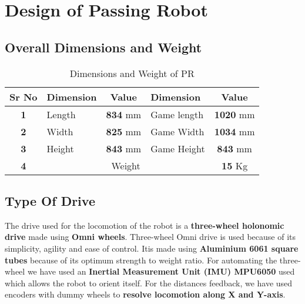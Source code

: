 \section{Design of Passing Robot}
    \subsection{Overall Dimensions and Weight}
        \begin{table}[h]
            \caption{Dimensions and Weight of PR} \label{Dimensiona_PR} \small
            \begin{tabular}{|c|l|c|l|c|}
                \hline
                \textbf{Sr No}  & \textbf{Dimension} & \textbf{Value}  & \textbf{Dimension}      & \textbf{Value}   \\ \hline
                \textbf{1}      & Length             & \textbf{834} mm & Game length             & \textbf{1020} mm \\ \hline
                \textbf{2}      & Width              & \textbf{825} mm & Game Width              & \textbf{1034} mm \\ \hline
                \textbf{3}      & Height             & \textbf{843} mm & Game Height             & \textbf{843} mm  \\ \hline
                \textbf{4}      & \multicolumn{3}{c|}{Weight}                                    & \textbf{15} Kg      \\ \hline
            \end{tabular}
        \end{table}
        
    \subsection{Type Of Drive}
        The drive used for the locomotion of the robot is a \textbf{three-wheel holonomic drive} made using \textbf{Omni wheels}. Three-wheel Omni drive is 
        used because of its simplicity, agility and ease of control. Itis made using \textbf{Aluminium 6061 square tubes} because of its optimum 
        strength to weight ratio. For automating the three-wheel we have used an \textbf{Inertial Measurement Unit (IMU) MPU6050} used which allows 
        the robot to orient itself. For the distances feedback, we have used encoders with dummy wheels to \textbf{resolve locomotion along X and 
        Y-axis}.

